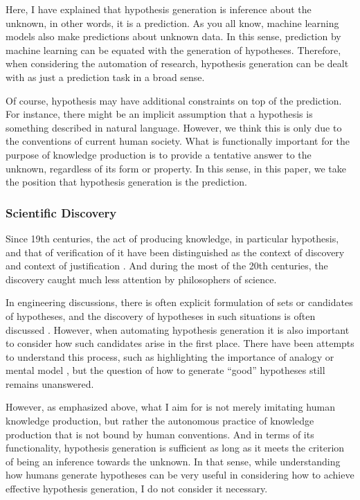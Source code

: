 \documentclass{book}
\begin{document}
Here, I have explained that hypothesis generation is inference about the unknown, in other words, it is a prediction. As you all know, machine learning models also make predictions about unknown data. In this sense, prediction by machine learning can be equated with the generation of hypotheses. Therefore, when considering the automation of research, hypothesis generation can be dealt with as just a prediction task in a broad sense.

Of course, hypothesis may have additional constraints on top of the prediction. For instance, there might be an implicit assumption that a hypothesis is something described in natural language. However, we think this is only due to the conventions of current human society. What is functionally important for the purpose of knowledge production is to provide a tentative answer to the unknown, regardless of its form or property. In this sense, in this paper, we take the position that hypothesis generation is the prediction.

\subsubsection{Scientific Discovery}


Since 19th centuries, the act of producing knowledge, in particular hypothesis, and that of verification of it have been distinguished as the context of discovery and context of justification \cite{sep-scientific-discovery}. And during the most of the 20th centuries, the discovery caught much less attention by philosophers of science. 

In engineering discussions, there is often explicit formulation of sets or candidates of hypotheses, and the discovery of hypotheses in such situations is often discussed \cite{simon1973does,kitano2021nobel,bengio2022ml4sci}. However, when automating hypothesis generation it is also important to consider how such candidates arise in the first place. There have been attempts to understand this process, such as highlighting the importance of analogy \cite{thagard1984conceptual} or mental model \cite{nersessian1999model}, but the question of how to generate ``good'' hypotheses still remains unanswered.

However, as emphasized above, what I aim for is not merely imitating human knowledge production, but rather the autonomous practice of knowledge production that is not bound by human conventions. And in terms of its functionality, hypothesis generation is sufficient as long as it meets the criterion of being an inference towards the unknown. In that sense, while understanding how humans generate hypotheses can be very useful in considering how to achieve effective hypothesis generation, I do not consider it necessary.
\end{document}
